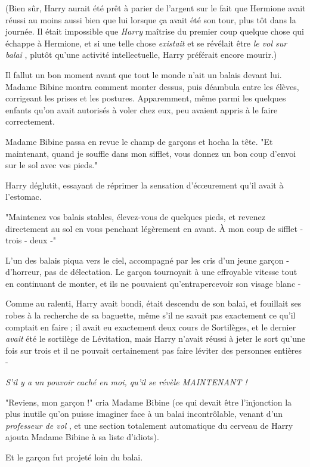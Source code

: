 (Bien sûr, Harry aurait été prêt à parier de l'argent sur le fait que Hermione avait réussi au moins aussi bien que lui lorsque ça avait été son tour, plus tôt dans la journée. Il était impossible que \emph{Harry}  maîtrise du premier coup quelque chose qui échappe à Hermione, et si une telle chose \emph{existait}  et se révélait être \emph{le vol sur balai} , plutôt qu'une activité intellectuelle, Harry préférait encore mourir.)

Il fallut un bon moment avant que tout le monde n'ait un balais devant lui. Madame Bibine montra comment monter dessus, puis déambula entre les élèves, corrigeant les prises et les postures. Apparemment, même parmi les quelques enfants qu'on avait autorisés à voler chez eux, peu avaient appris à le faire correctement.

Madame Bibine passa en revue le champ de garçons et hocha la tête. "Et maintenant, quand je souffle dans mon sifflet, vous donnez un bon coup d'envoi sur le sol avec vos pieds."

Harry déglutit, essayant de réprimer la sensation d'écœurement qu'il avait à l'estomac.

"Maintenez vos balais stables, élevez-vous de quelques pieds, et revenez directement au sol en vous penchant légèrement en avant. À mon coup de sifflet - trois - deux -"

L'un des balais piqua vers le ciel, accompagné par les cris d'un jeune garçon - d'horreur, pas de délectation. Le garçon tournoyait à une effroyable vitesse tout en continuant de monter, et ils ne pouvaient qu'entrapercevoir son visage blanc -

Comme au ralenti, Harry avait bondi, était descendu de son balai, et fouillait ses robes à la recherche de sa baguette, même s'il ne savait pas exactement ce qu'il comptait en faire ; il avait eu exactement deux cours de Sortilèges, et le dernier \emph{avait}  été le sortilège de Lévitation, mais Harry n'avait réussi à jeter le sort qu'une fois sur trois et il ne pouvait certainement pas faire léviter des personnes entières -

\emph{S'il y a un pouvoir caché en moi, qu'il se révèle MAINTENANT !} 

"Reviens, mon garçon !" cria Madame Bibine (ce qui devait être l'injonction la plus inutile qu'on puisse imaginer face à un balai incontrôlable, venant d'un \emph{professeur de vol} , et une section totalement automatique du cerveau de Harry ajouta Madame Bibine à sa liste d'idiots).

Et le garçon fut projeté loin du balai.

